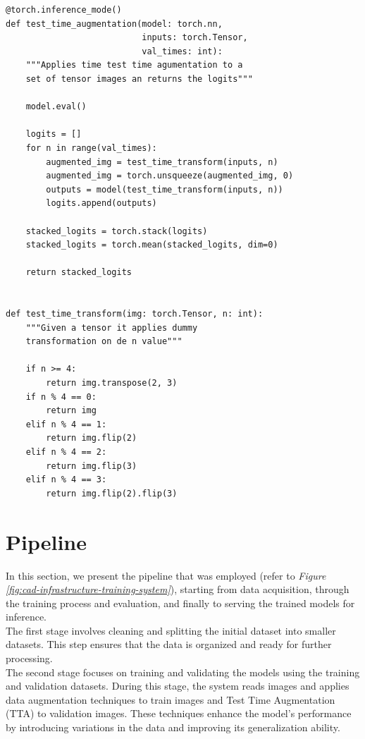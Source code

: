 \begin{Verbatim}[fontsize=\scriptsize]
@torch.inference_mode()
def test_time_augmentation(model: torch.nn,
                           inputs: torch.Tensor,
                           val_times: int):
    """Applies time test time agumentation to a
    set of tensor images an returns the logits"""

    model.eval()

    logits = []
    for n in range(val_times):
        augmented_img = test_time_transform(inputs, n)
        augmented_img = torch.unsqueeze(augmented_img, 0)
        outputs = model(test_time_transform(inputs, n))
        logits.append(outputs)

    stacked_logits = torch.stack(logits)
    stacked_logits = torch.mean(stacked_logits, dim=0)

    return stacked_logits


def test_time_transform(img: torch.Tensor, n: int):
    """Given a tensor it applies dummy
    transformation on de n value"""

    if n >= 4:
        return img.transpose(2, 3)
    if n % 4 == 0:
        return img
    elif n % 4 == 1:
        return img.flip(2)
    elif n % 4 == 2:
        return img.flip(3)
    elif n % 4 == 3:
        return img.flip(2).flip(3)
\end{Verbatim}

\section{Pipeline}

In this section, we present the pipeline that was employed (refer to
\textit{Figure \ref{fig:cad-infrastructure-training-system}}), starting from
data acquisition, through the training process and evaluation, and finally to
serving the trained models for inference. \\

The first stage involves cleaning and splitting the initial dataset into
smaller datasets. This step ensures that the data is organized and ready for
further processing. \\

The second stage focuses on training and validating the models using the
training and validation datasets. During this stage, the system reads images
and applies data augmentation techniques to train images and Test Time
Augmentation (TTA) to validation images. These techniques enhance the model's
performance by introducing variations in the data and improving its
generalization ability. \\

